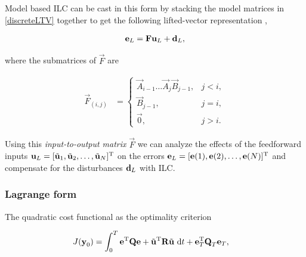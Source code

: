 \noindent Model based ILC can be cast in this form by stacking the model matrices in \eqref{discreteLTV} together to get the following lifted-vector representation \cite{Bristow06}, \cite{Schoellig12}

\begin{equation}
\begin{aligned}
\boldsymbol{\mathrm{e}}_L &= \boldsymbol{\mathrm{F}}\boldsymbol{\mathrm{u}}_L + \boldsymbol{\mathrm{d}}_L, \\
\end{aligned}
\label{liftedLTV}
\end{equation}

\noindent where the submatrices of $\vec{F}$ are

\begin{equation*}
\begin{aligned}
\vec{F}_{(i,j)} &= \left \{
\begin{array}{cc}
\vec{A}_{i-1}\ldots \vec{A}_j \vec{B}_{j-1}, & j < i, \\ 
\vec{B}_{j-1}, & j = i, \\
\vec{0}, & j > i. 
\end{array} \right.
\end{aligned}
\end{equation*}

\noindent Using this \emph{input-to-output matrix} $\vec{F}$ we can analyze the effects of the feedforward inputs $\boldsymbol{\mathrm{u}}_L = [\tilde{\boldsymbol{\mathrm{u}}}_1, \tilde{\boldsymbol{\mathrm{u}}}_2, \ldots, \tilde{\boldsymbol{\mathrm{u}}}_{N}]^{\mathrm{T}}$ on the errors $\boldsymbol{\mathrm{e}}_L = [\boldsymbol{\mathrm{e}}(1),\boldsymbol{\mathrm{e}}(2),\ldots,\boldsymbol{\mathrm{e}}(N)]^{\mathrm{T}}$ and compensate for the disturbances $\boldsymbol{\mathrm{d}}_L$ with ILC.


\subsubsection{Lagrange form} The quadratic cost functional as the optimality criterion

\begin{equation}
\begin{aligned}
J(\boldsymbol{\mathrm{y}}_0) &= \int_{0}^{T} \boldsymbol{\mathrm{e}}^{\mathrm{T}}\boldsymbol{\mathrm{Q}}\boldsymbol{\mathrm{e}} + \tilde{\boldsymbol{\mathrm{u}}}^{\mathrm{T}}\boldsymbol{\mathrm{R}}\tilde{\boldsymbol{\mathrm{u}}} \ \mathrm{d}t + \boldsymbol{\mathrm{e}}_{T}^{\mathrm{T}}\boldsymbol{\mathrm{Q}}_{T}\boldsymbol{\mathrm{e}}_{T},
\end{aligned}
\label{cost}
\end{equation}

